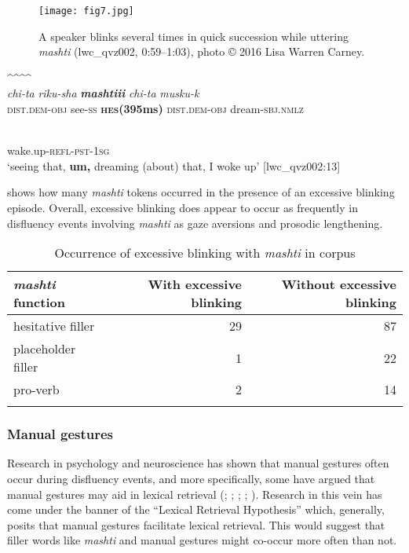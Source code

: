 \documentclass[output=paper]{langscibook}
\begin{document}
  
\begin{figure}
\texttt{[image: fig7.jpg]}
\caption{\label{fig:rice:7} A speaker blinks several times in quick succession while uttering \textit{mashti} (lwc\_qvz002, 0:59--1:03), photo © 2016 Lisa Warren Carney.}
\end{figure}

\ea%
\label{ex:rice:28}
\glll {} {} {\textbf{\^{}\^{}\^{}\^{}}} {} {}\\
{\textit{chi-ta}} {\textit{riku-sha}} {\textbf{\textit{mashtiii}}} {\textit{chi-ta}} {\textit{musku-k}}\\
{\textsc{dist.dem-obj}} {see-\textsc{ss}}    {\textbf{\textsc{hes}}\textbf{(395ms)}} {\textsc{dist.dem-obj}}  {dream\textsc{{}-sbj.nmlz}}\\
\medskip

\\
{wake.up-\textsc{refl-pst-1sg}}\\
\glt ‘seeing that, \textbf{um,} dreaming (about) that, I woke up’ [lwc\_qvz002:13]
\z

 shows how many \textit{mashti} tokens occurred in the presence of an excessive blinking episode. Overall, excessive blinking does appear to occur as frequently in disfluency events involving \textit{mashti} as gaze aversions and prosodic lengthening.

\begin{table}
\begin{tabular}{lrr}
\lsptoprule
\textit{mashti} function & With excessive blinking & Without excessive blinking\\
\midrule
hesitative filler & 29 & 87\\
placeholder filler & 1 & 22\\
pro-verb & 2 & 14\\
\lspbottomrule
\end{tabular}
\caption{\label{tab:rice:12} Occurrence of excessive blinking with \textit{mashti} in corpus}
\end{table}

\subsubsection{Manual gestures}
\label{sec:rice:4.2.3}
Research in psychology and neuroscience has shown that manual gestures often occur during disfluency events, and more specifically, some have argued that manual gestures may aid in lexical retrieval (\citealt{Butterworth1978}; \citealt{Rauscher1996}; \citealt{Krauss1999}; \citealt{Pyers2021}; \citealt{Osorio2023}). Research in this vein has come under the banner of the “Lexical Retrieval Hypothesis” which, generally, posits that manual gestures facilitate lexical retrieval. This would suggest that filler words like \textit{mashti} and manual gestures might co-occur more often than not. 
\end{document}
